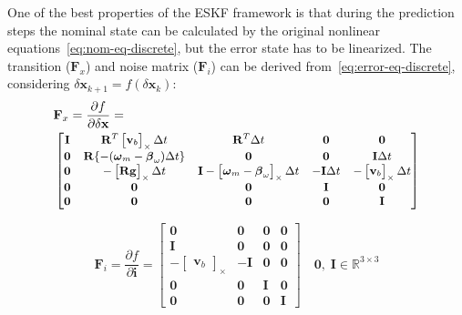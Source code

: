 One of the best properties of the ESKF framework is that during the prediction steps the nominal state can be calculated by the original nonlinear equations~\eqref{eq:nom-eq-discrete}, but the error state has to be linearized. The transition ($\mathbf{F}_x$) and noise matrix ($\mathbf{F}_i$) can be derived from~\eqref{eq:error-eq-discrete}, considering $\delta\mathbf{x}_{k+1}=f(\delta\mathbf{x}_k)$:
\begin{equation}
\begin{aligned}
     &\mathbf{F}_x=\frac{\partial f}{\partial\delta\mathbf{x}}= \\  
     & \small \begin{bmatrix}
        \mathbf{I} & \mathbf{R}^T\begin{bmatrix}\mathbf{v}_{b}\end{bmatrix}_\times\Delta t & \mathbf{R}^T\Delta t & \mathbf{0} & \mathbf{0} \\
        \mathbf{0} & \mathbf{R}\{-(\boldsymbol{\omega}_{m}-\boldsymbol{\beta}_{\omega})\Delta t\} & \mathbf{0} & \mathbf{0} & \mathbf{I}\Delta t \\
        \mathbf{0} & -\begin{bmatrix}\mathbf{R}\mathbf{g}\end{bmatrix}_\times\Delta t & \mathbf{I}-\begin{bmatrix} \boldsymbol{\omega}_{m}-\boldsymbol{\beta}_{\omega}\end{bmatrix}_\times\Delta t & -\mathbf{I}\Delta t & -\begin{bmatrix} \mathbf{v}_{b}\end{bmatrix}_\times\Delta t \\
        \mathbf{0} & \mathbf{0} & \mathbf{0} & \mathbf{I} & \mathbf{0} \\
        \mathbf{0} & \mathbf{0} & \mathbf{0} & \mathbf{0} & \mathbf{I}
    \end{bmatrix}
\end{aligned}
\end{equation}

\begin{equation}
    \mathbf{F}_i=\frac{\partial f}{\partial \mathbf{i}}=\begin{bmatrix}
         \mathbf{0} & \mathbf{0} & \mathbf{0} & \mathbf{0} \\
         \mathbf{I} & \mathbf{0} & \mathbf{0} & \mathbf{0} \\
         -\begin{bmatrix}
             \mathbf{v}_{b}
         \end{bmatrix}_\times & -\mathbf{I} & \mathbf{0} & \mathbf{0} \\
         \mathbf{0} & \mathbf{0} & \mathbf{I} & \mathbf{0} \\
         \mathbf{0} & \mathbf{0} & \mathbf{0} & \mathbf{I}
    \end{bmatrix} \quad \mathbf{0},\; \mathbf{I}\in\mathbb{R}^{3\times 3}
\end{equation}

